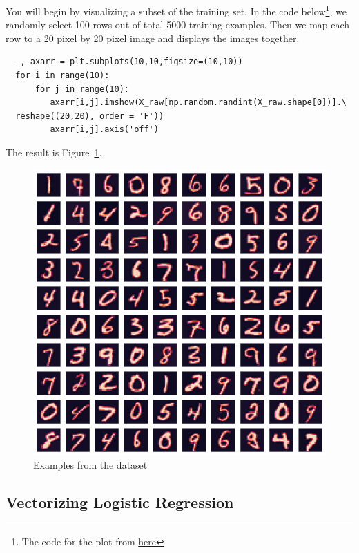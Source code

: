 \documentclass[12pt]{article}
\begin{document}
You will begin by visualizing a subset of the training set. In the code below\footnote{The code for the plot from \href{https://medium.com/analytics-vidhya/a-guide-to-using-logistic-regression-for-digit-recognition-with-python-codes-86aae6da10fe}{here}}, we randomly select 100 rows out of total 5000 training examples. Then we map each row to a 20 pixel by 20 pixel image and displays the images together. 

\begin{lstlisting}
  _, axarr = plt.subplots(10,10,figsize=(10,10))
  for i in range(10):
      for j in range(10):
         axarr[i,j].imshow(X_raw[np.random.randint(X_raw.shape[0])].\
  reshape((20,20), order = 'F'))          
         axarr[i,j].axis('off') 
\end{lstlisting}

The result is Figure~\ref{fig:digits}.

\begin{figure}[h!]
  \centering
  \includegraphics[scale=0.4]{digits.png}
  \caption{Examples from the dataset}
  \label{fig:digits}
\end{figure}

\subsection{Vectorizing Logistic Regression}
\end{document}
